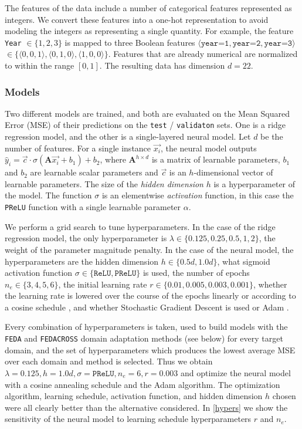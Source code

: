 \documentclass{article}
\begin{document}
The features of the data include a number of categorical features represented as integers. We convert these features into a one-hot representation to avoid modeling the integers as representing a single quantity. For example, the feature \texttt{Year} \(\in \{1, 2, 3\}\) is mapped to three Boolean features \(\langle \texttt{year=1}, \texttt{year=2}, \texttt{year=3}\rangle\) \( \in \{ \langle 0, 0, 1\rangle, \langle 0, 1, 0\rangle, \langle 1, 0, 0 \rangle \} \). Features that are already numerical are normalized to within the range \([0, 1]\). The resulting data has dimension \(d = 22\).

\subsubsection{Models}

Two different models are trained, and both are evaluated on the Mean Squared Error (MSE) of their predictions on the \texttt{test} / \texttt{validaton} sets. One is a ridge regression model, and the other is a single-layered neural model. Let \(d\) be the number of features. For a single instance \(\vec{x_i}\), the neural model outputs \(\hat{y}_i = \vec{c} \cdot \sigma(\mathbf{A}\vec{x_i} + b_1)  + b_2\), where \(\mathbf{A}^{h \times d}\) is a matrix of learnable parameters, \(b_1\) and \(b_2\) are learnable scalar parameters and \(\vec{c}\) is an \(h\)-dimensional vector of learnable parameters. The size of the \textit{hidden dimension} \(h\) is a hyperparameter of the model. The function \(\sigma\) is an elementwise \textit{activation} function, in this case the \texttt{PReLU} function \citep{prelu} with a single learnable parameter \(\alpha\). %

We perform a grid search to tune hyperparameters. In the case of the ridge regression model, the only hyperparameter is \(\lambda \in \{0.125, 0.25, 0.5, 1, 2\} \), the weight of the parameter magnitude penalty. In the case of the neural model, the hyperparameters are the hidden dimension \(h \in \{0.5d, 1.0d\} \), what sigmoid activation function \(\sigma \in \{\texttt{ReLU}, \texttt{PReLU}\} \) is used, the number of epochs \(n_e \in \{3, 4, 5, 6\}\), the initial learning rate \(r \in \{0.01, 0.005, 0.003, 0.001\}\), whether the learning rate is lowered over the course of the epochs linearly or according to a cosine schedule \citep{cosine}, and whether Stochastic Gradient Descent is used or Adam \citep{adam}. 

Every combination of hyperparameters is taken, used to build models with the \texttt{FEDA} and \texttt{FEDACROSS} domain adaptation methods (see below) for every target domain, and the set of hyperparameters which produces the lowest average MSE over each domain and method is selected. Thus we obtain \(\lambda = 0.125, h = 1.0d, \sigma = \texttt{PReLU}, n_e = 6, r = 0.003\) and optimize the neural model with a cosine annealing schedule and the Adam algorithm. The optimization algorithm, learning schedule, activation function, and hidden dimension \(h\) chosen were all clearly better than the alternative considered. In \ref{hypers} we show the sensitivity of the neural model to learning schedule hyperparameters \(r\) and \(n_e\).
\end{document}
